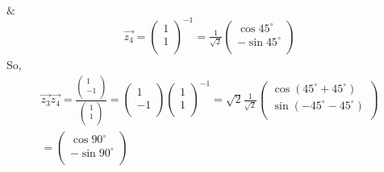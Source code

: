 \documentclass[journal,12pt,twocolumn]{IEEEtran}
\begin{document}
$\&$
\begin{align}
\vec{z_4} = \begin{pmatrix}
      1 \\ 
      1 \\
      \end{pmatrix}^{-1} = \frac{1}{\sqrt{2}}\begin{pmatrix}
      \cos45^{\circ} \\ 
      -\sin45^{\circ} \\
      \end{pmatrix}
\end{align}
So,\\
\begin{equation}
\begin{aligned}
\vec{z_3} \vec{z_4} = \frac{\begin{pmatrix}
      1 \\ 
      -1 \\
      \end{pmatrix}}{\begin{pmatrix}
      1 \\ 
      1 \\
      \end{pmatrix}}=\begin{pmatrix}
      1 \\ 
      -1 \\
      \end{pmatrix} \begin{pmatrix}
      1 \\ 
      1 \\
      \end{pmatrix}^{-1} = \sqrt{2}\frac{1}{\sqrt{2}}\begin{pmatrix}
      \cos(45^{\circ}+45^{\circ})\\ 
      \sin(-45^{\circ}-45^{\circ})\\
      \end{pmatrix}\\
      =\begin{pmatrix}
      \cos90^{\circ} \\ 
      -\sin90^{\circ} \\
      \end{pmatrix}
\end{aligned}
\end{equation}
\end{document}
